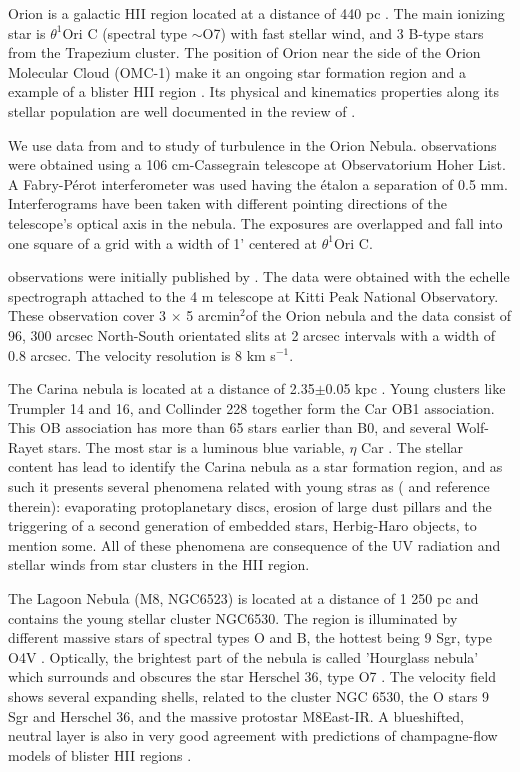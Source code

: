 \documentclass[fleqn,usenatbib, useAMS, a4paper]{mnras}
\begin{document}
Orion is a galactic HII region located at a distance of 440 pc \citep{2008AJ....136.1566O}.
The main ionizing star is \(\theta^{1}\)Ori C (spectral type \(\sim\)O7) with fast stellar wind, and 3 B-type stars from the Trapezium cluster.
The position of Orion near the side of the Orion Molecular Cloud (OMC-1) make it an ongoing star formation region and a example of a blister HII region \citep{arthur2016turbulence}.
Its physical and kinematics properties along its stellar population are well documented in the review of \citet{2001ARA&A..39...99O}.

We use data from \citet{1987A&A...176..347H} and \citep{arthur2016turbulence} to study of turbulence in the Orion Nebula.
\cite{1987A&A...176..347H} observations were obtained using a 106 cm-Cassegrain telescope at Observatorium Hoher List. 
A Fabry-Pérot interferometer was used having the étalon a separation of 0.5 mm. 
Interferograms have been taken with different pointing directions of the telescope's optical axis in the nebula. 
The exposures are overlapped and fall into one square of a grid with a width of 1' centered at \(\theta^{1}\)Ori C.   

\citet{arthur2016turbulence} observations were initially published by \citet{2008RMxAA..44..181G}. The data were obtained with the echelle spectrograph attached to the 4 m telescope at Kitti Peak National Observatory. These observation cover 3 \(\times\) 5 arcmin\(^{2}\)of the Orion nebula and the data consist of 96, 300 arcsec North-South orientated slits at 2 arcsec intervals with a width of 0.8 arcsec. The velocity resolution is 8 km s\(^{-1}\).

The Carina nebula is located at a distance of 2.35$\pm$0.05 kpc \citep{2006ApJ...644.1151S}.
Young clusters like Trumpler 14 and 16, and Collinder 228 together form the Car OB1 association.
This OB association has more than 65 stars earlier than B0, and several Wolf-Rayet stars.
The most star is a luminous blue variable, $\eta$ Car \citep{Damiani:2016a}.
The stellar content has lead to identify the Carina nebula as a star formation region, and as such it presents several phenomena related with young stras as (\citet{2006ApJ...644.1151S} and reference therein): evaporating protoplanetary discs, erosion of large dust pillars and the triggering of a second generation of embedded stars, Herbig-Haro objects, to mention some. 
All of these phenomena are consequence of the UV radiation and stellar winds from star clusters in the HII region.

The Lagoon Nebula (M8, NGC6523) is located at a distance of 1 250 pc \citep{2005A&A...430..941P} and contains the young stellar cluster NGC6530.
The region is illuminated by different massive stars of spectral types O and B, the hottest being 9 Sgr, type O4V \citep{Damiani:2017b}.
Optically, the brightest part of the nebula is called 'Hourglass nebula' which surrounds and obscures the star Herschel 36, type O7 \citep{1986AJ.....91..870W}. 
The velocity field shows several expanding shells, related to the cluster NGC 6530, the O stars 9 Sgr and Herschel 36, and the massive protostar M8East-IR. A blueshifted, neutral layer is also in very good agreement with predictions of champagne-flow models of blister HII regions \citep{Damiani:2017b}.
\end{document}
